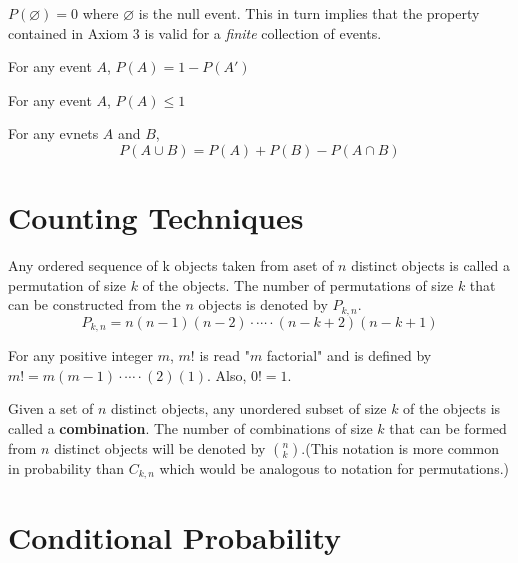 \begin{proposition}
	$P(\varnothing)=0$ where $\varnothing$ is the null event. This in turn implies that the property contained in Axiom 3 is valid for a \textit{finite} collection of events.
\end{proposition}

\begin{proposition}
	For any event $A$, $P(A) = 1 - P(A')$
\end{proposition}

\begin{proposition}
	For any event $A$, $P(A) \leq 1$
\end{proposition}

\begin{proposition}
	For any evnets $A$ and $B$, 
	$$ P(A\cup B) = P (A) + P (B) - P (A\cap B) $$
\end{proposition}

\section{Counting Techniques}

\begin{definition}
	Any ordered sequence of k objects taken from aset of $n$ distinct objects is called a permutation of size $k$ of the objects. The number of permutations of size $k$ that can be constructed from the $n$ objects is denoted by $P_{k, n}$.
	$$ P_{k, n} = n (n - 1) (n - 2) \cdot \cdots \cdot (n - k + 2) (n - k + 1)$$
\end{definition}

\begin{definition}
	For any positive integer $m$, $m!$ is read "$m$ factorial" and is defined by $m! = m(m - 1)\cdot\cdots\cdot(2)(1)$. Also, $0! = 1$.
\end{definition}

\begin{definition}
	Given a set of $n$ distinct objects, any unordered subset of size $k$ of the objects is called a \textbf{combination}. The number of combinations of size $k$ that can be formed from $n$ distinct objects will be denoted by $\left(_k^n\right)$.(This notation is more common in probability than $C_{k, n}$ which would be analogous to notation for permutations.)
\end{definition}

\section{Conditional Probability}

